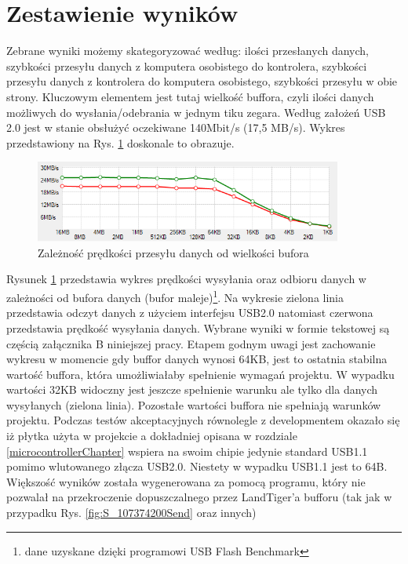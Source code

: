 \documentclass{BscUS}
\begin{document}
\section{Zestawienie wyników}
\indent Zebrane wyniki możemy skategoryzować według: ilości przesłanych danych, szybkości przesyłu danych z komputera osobistego do kontrolera, szybkości przesyłu danych z kontrolera do komputera osobistego, szybkości przesyłu w obie strony. Kluczowym elementem jest tutaj wielkość buffora, czyli ilości danych możliwych do wysłania/odebrania w jednym tiku zegara.
\newline
\indent Według założeń USB 2.0 jest w stanie obsłużyć oczekiwane 140Mbit/s (17,5 MB/s). Wykres przedstawiony na Rys. \ref{fig:speedTest} doskonale to obrazuje.
\begin{figure}[H]
\centering
\includegraphics[width=0.9\textwidth]{./img/speedTest}
\caption{Zależność prędkości przesyłu danych od wielkości bufora}
\label{fig:speedTest}
\end{figure}
Rysunek \ref{fig:speedTest} przedstawia wykres prędkości wysyłania oraz odbioru danych w zależności od bufora danych (bufor maleje)\footnote{dane uzyskane dzięki programowi USB Flash Benchmark\cite{USBFlashBenchmark}}. Na wykresie zielona linia przedstawia odczyt danych z użyciem interfejsu USB2.0 natomiast czerwona przedstawia prędkość wysyłania danych. Wybrane wyniki w formie tekstowej są częścią załącznika B niniejszej pracy. Etapem godnym uwagi jest zachowanie wykresu w momencie gdy buffor danych wynosi 64KB, jest to ostatnia stabilna wartość buffora, która umożliwiałaby spełnienie wymagań projektu. W wypadku wartości 32KB widoczny jest jeszcze spełnienie warunku ale tylko dla danych wysyłanych (zielona linia). Pozostałe wartości buffora nie spełniają warunków projektu.
\newline
\indent Podczas testów akceptacyjnych równolegle z developmentem okazało się iż płytka użyta w projekcie a dokładniej opisana w rozdziale \ref{microcontrollerChapter} wspiera na swoim chipie jedynie standard USB1.1 pomimo wlutowanego złącza USB2.0. Niestety w wypadku USB1.1 jest to 64B. Większość wyników została wygenerowana za pomocą programu, który nie pozwalał na przekroczenie dopuszczalnego przez LandTiger'a bufforu (tak jak w przypadku Rys. \ref{fig:S_107374200Send} oraz innych)
\end{document}
